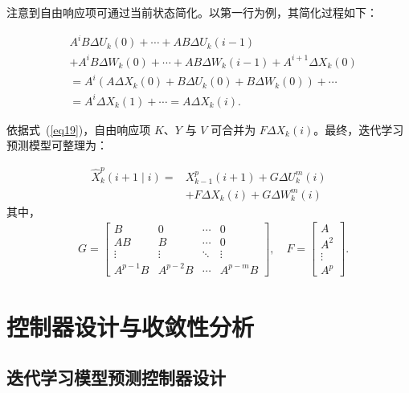 注意到自由响应项可通过当前状态简化。以第一行为例，其简化过程如下：

\begin{equation}
\begin{aligned}
& A^i B \Delta U_k(0) + \cdots + A B \Delta U_k(i-1) \\
& + A^i B \Delta W_k(0) + \cdots + A B \Delta W_k(i-1) + A^{i+1} \Delta X_k(0) \\
&= A^i \left(A \Delta X_k(0) + B \Delta U_k(0) + B \Delta W_k(0)\right) + \cdots \\
&= A^i \Delta X_k(1) + \cdots = A \Delta X_k(i).
\end{aligned}
\label{eq19}
\end{equation}

依据式~(\ref{eq19})，自由响应项 $K$、$Y$ 与 $V$ 可合并为 $F \Delta X_k(i)$。最终，迭代学习预测模型可整理为：

\begin{equation}
\begin{aligned}
\hat{X}_k^p(i+1 \mid i)= & X_{k-1}^p(i+1)+G \Delta U_k^m(i) \\
& + F \Delta X_k(i) + G \Delta W_k^m(i)
\end{aligned}
\label{eq20}
\end{equation}
其中，
\begin{equation*}
\begin{aligned}
& G =\left[\begin{array}{cccc}
B & 0 & \cdots & 0 \\
A B & B & \cdots & 0 \\
\vdots & \vdots & \ddots & \vdots \\
A^{p-1} B & A^{p-2} B & \cdots & A^{p-m} B
\end{array}\right], \quad
F =\left[\begin{array}{c}
A \\ 
A^2 \\ 
\vdots \\
A^p
\end{array}\right].
\end{aligned}
\end{equation*}

\section{控制器设计与收敛性分析}
\label{section4}

\subsection{迭代学习模型预测控制器设计}

